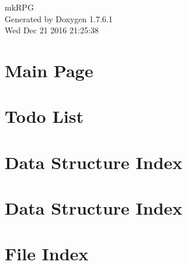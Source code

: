 \documentclass[a4paper]{book}
\begin{document}
\hypersetup{pageanchor=false,citecolor=blue}
\begin{titlepage}
\vspace*{7cm}
\begin{center}
{\Large mk\-R\-P\-G }\\
\vspace*{1cm}
{\large \-Generated by Doxygen 1.7.6.1}\\
\vspace*{0.5cm}
{\small Wed Dec 21 2016 21:25:38}\\
\end{center}
\end{titlepage}
\clearemptydoublepage
{}
\tableofcontents
\clearemptydoublepage
{}
\hypersetup{pageanchor=true,citecolor=blue}
\chapter{\-Main \-Page}
\label{index}\hypertarget{index}{}
\chapter{\-Todo \-List}
\label{todo}
\hypertarget{todo}{}

\chapter{\-Data \-Structure \-Index}

\chapter{\-Data \-Structure \-Index}

\chapter{\-File \-Index}

\end{document}
